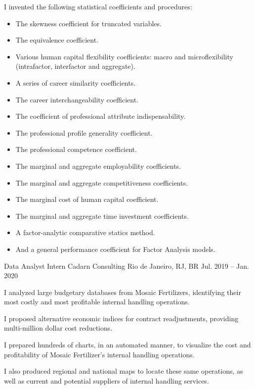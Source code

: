 \begin{cventries}
{\begin{cvitems}
\item {I invented the following statistical coefficients and procedures: \begin{itemize}[leftmargin = 0.25cm] \item{The skewness coefficient for truncated variables.} \item{The equivalence coefficient}. \item{Various human capital flexibility coefficients: macro and microflexibility (intrafactor, interfactor and aggregate).} \item{A series of career similarity coefficients.} \item{The career interchangeability coefficient.} \item{The coefficient of professional attribute indispensability.} \item{The professional profile generality coefficient.} \item{The professional competence coefficient.} \item{The marginal and aggregate employability coefficients.} \item{The marginal and aggregate competitiveness coefficients.} \item{The marginal cost of human capital coefficient.} \item{The marginal and aggregate time investment coefficients.} \item{A factor-analytic comparative statics method.} \item{And a general performance coefficient for Factor Analysis models.} \end{itemize}}
\end{cvitems}
}

\cventry
{Data Analyst Intern} %
{Cadarn Consulting} %
{Rio de Janeiro, RJ, BR} %
{Jul. 2019 -- Jan. 2020} %
{%
\begin{cvitems}
\item {I analyzed large budgetary databases from Mosaic Fertilizers, identifying their most costly and most profitable internal handling operations.}
\item {I proposed alternative economic indices for contract readjustments, providing multi-million dollar cost reductions.}
\item {I prepared hundreds of charts, in an automated manner, to visualize the cost and profitability of Mosaic Fertilizer's internal handling operations.}
\item {I also produced regional and national maps to locate these same operations, as well as current and potential suppliers of internal handling services.}
\end{cvitems}
}

\end{cventries}